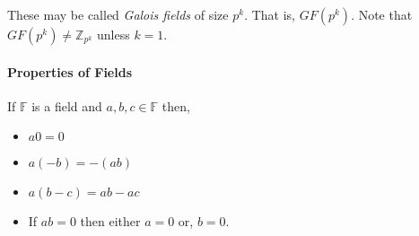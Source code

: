 These may be called \textit{Galois fields} of size \(p^k\). That is,
\(GF(p^k)\).
Note that \(GF(p^k) \neq \mathbb{Z}_{p^k}\) unless \(k = 1\).

\paragraph{Properties of Fields}
If \(\mathbb{F}\) is a field and \(a, b, c \in \mathbb{F}\) then,
\begin{itemize}
    \item \(a0 = 0\)
    \item \(a(-b) = -(ab)\)
    \item \(a(b-c) = ab - ac\)
    \item If \(ab = 0\) then either \(a = 0\) or, \(b = 0\).
\end{itemize}

